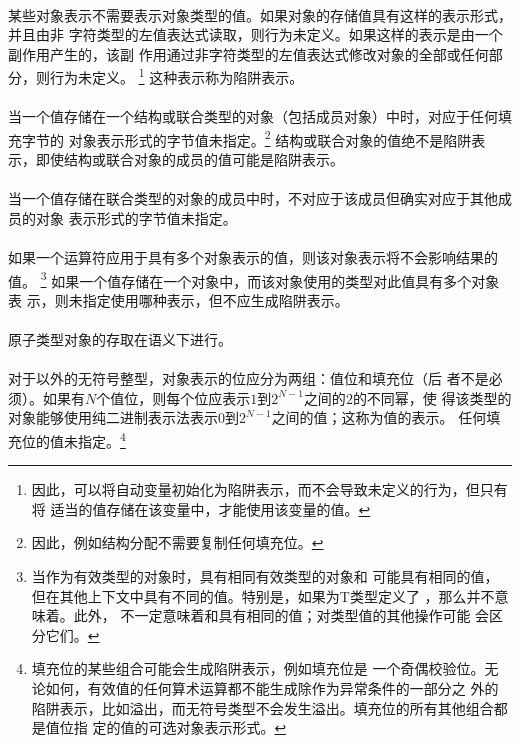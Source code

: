 \paragraph{}
某些对象表示不需要表示对象类型的值。如果对象的存储值具有这样的表示形式，并且由非
字符类型的左值表达式读取，则行为未定义。如果这样的表示是由一个副作用产生的，该副
作用通过非字符类型的左值表达式修改对象的全部或任何部分，则行为未定义。
\footnote{因此，可以将自动变量初始化为陷阱表示，而不会导致未定义的行为，但只有将
适当的值存储在该变量中，才能使用该变量的值。} 这种表示称为陷阱表示。

\paragraph{}
当一个值存储在一个结构或联合类型的对象（包括成员对象）中时，对应于任何填充字节的
对象表示形式的字节值未指定。\footnote{因此，例如结构分配不需要复制任何填充位。}
结构或联合对象的值绝不是陷阱表示，即使结构或联合对象的成员的值可能是陷阱表示。

\paragraph{}
当一个值存储在联合类型的对象的成员中时，不对应于该成员但确实对应于其他成员的对象
表示形式的字节值未指定。

\paragraph{}
如果一个运算符应用于具有多个对象表示的值，则该对象表示将不会影响结果的值。
\footnote{当作为有效类型的对象时，具有相同有效类型的对象和
可能具有相同的值，但在其他上下文中具有不同的值。特别是，如果为T类型定义了
\tm{==}，那么并不意味着。此外，
不一定意味着和具有相同的值；对类型值的其他操作可能
会区分它们。} 如果一个值存储在一个对象中，而该对象使用的类型对此值具有多个对象表
示，则未指定使用哪种表示，但不应生成陷阱表示。

\paragraph{}
原子类型对象的存取在语义下进行。


\paragraph{}
对于以外的无符号整型，对象表示的位应分为两组：值位和填充位（后
者不是必须）。如果有$N$个值位，则每个位应表示$1$到$2^{N−1}$之间的$2$的不同幂，使
得该类型的对象能够使用纯二进制表示法表示$0$到$2^{N−1}$之间的值；这称为值的表示。
任何填充位的值未指定。\footnote{填充位的某些组合可能会生成陷阱表示，例如填充位是
一个奇偶校验位。无论如何，有效值的任何算术运算都不能生成除作为异常条件的一部分之
外的陷阱表示，比如溢出，而无符号类型不会发生溢出。填充位的所有其他组合都是值位指
定的值的可选对象表示形式。}

